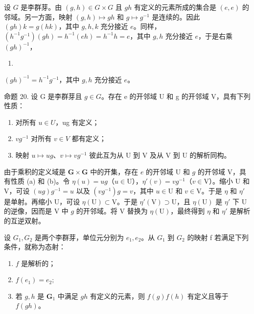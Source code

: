 设 \(G\) 是李群芽。由 \((g, h) \in G \times G\) 且 \(gh\) 有定义的元素所成的集合是 \((e, e)\) 的邻域。另一方面，映射 \((g, h) \mapsto gh\) 和 \(g \mapsto g^{-1}\) 是连续的。因此 \((gh)k = g(hk)\)，其中 \(g, h, k\) 充分接近 \(e\)。同样，\((h^{-1}g^{-1})(gh) = h^{-1}(eh) = h^{-1}h = e\)，其中 \(g, h\) 充分接近 \(e\)，于是右乘 \((gh)^{-1}\)，

\begin{enumerate}
\def\labelenumi{(\arabic{enumi})}
\setcounter{enumi}{9}
\tightlist
\item
\end{enumerate}

\((gh)^{-1} = h^{-1}g^{-1}\)，其中 \(g,h\) 充分接近 \(e\)。

命题 20. 设 G 是李群芽且 \(g \in G\)。存在 e 的开邻域 U 和 g 的开邻域 V，具有下列性质：

\begin{enumerate}
\def\labelenumi{(\alph{enumi})}
\item
  对所有 \(u \in U\)，ug 有定义；
\item
  \(vg^{-1}\) 对所有 \(v \in V\) 都有定义；
\item
  映射 \(u \mapsto ug\)、\(v \mapsto vg^{-1}\) 彼此互为从 U 到 V 及从 V 到 U 的解析同构。
\end{enumerate}

  由于乘积的定义域是 \(\mathbf{G} \times \mathbf{G}\) 中的开集，存在 \(e\) 的开邻域 U 和 \(g\) 的开邻域 V，具有性质 (a) 和 (b)。令 \(\eta(u) = ug\)（\(u \in \mathrm{U}\)），\(\eta'(v) = vg^{-1}\)（\(v \in \mathrm{V}\)）。缩小 U 和 V，可设 \((ug)g^{-1} = u\) 以及 \((vg^{-1})g = v\)，其中 \(u \in \mathrm{U}\) 和 \(v \in \mathrm{V}\)。于是 \(\eta\) 和 \(\eta'\) 是单射。再缩小 U，可设 \(\eta(\mathrm{U}) \subset \mathrm{V}\)。于是 \(\eta'(\mathrm{V}) \supset \mathrm{U}\)，且 \(\eta(\mathrm{U})\) 是 \(\eta'\) 下 U 的逆像，因而是 V 中 \(g\) 的开邻域。将 V 替换为 \(\eta(\mathrm{U})\)，最终得到 \(\eta\) 和 \(\eta'\) 是解析的互逆双射。

设 \(G_{1}, G_{2}\) 是两个李群芽，单位元分别为 \(e_{1}, e_{2}\)。从 \(G_{1}\) 到 \(G_{2}\) 的映射 f 若满足下列条件，就称为态射：

\begin{enumerate}
\def\labelenumi{(\roman{enumi})}
\item
  \(f\) 是解析的；
\item
  \(f(e_{1}) = e_{2};\)
\item
  若 \(g, h\) 是 \(\mathbf{G}_1\) 中满足 \(gh\) 有定义的元素，则 \(f(g)f(h)\) 有定义且等于 \(f(gh)\)。
\end{enumerate}

